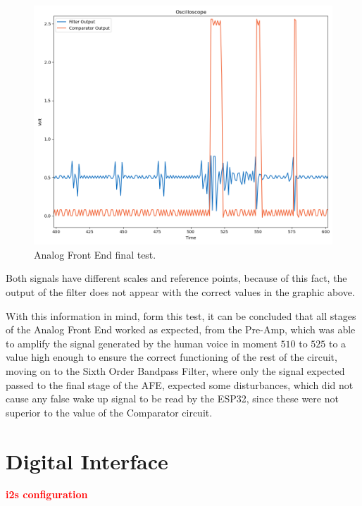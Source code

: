 \begin{figure}[H]
    \centering
    \includegraphics*[scale = 0.5]{Images/AFEtest.png}
    \caption{Analog Front End final test.}
    \label{fig:AFETest}
\end{figure}

Both signals have different scales and reference points, because of this fact, the output of the filter does not appear with the correct values in the graphic above. 

With this information in mind, form this test, it can be concluded that all stages of the Analog Front End worked as expected, from the Pre-Amp, which was able to amplify the signal generated by the human voice in moment $510$ to $525$ to a value high enough to ensure the correct functioning of the rest of the circuit, moving on to the Sixth Order Bandpass Filter, where only the signal expected passed to the final stage of the AFE, expected some disturbances, which did not cause any false wake up signal to be read by the ESP32, since these were not superior to the value of the Comparator circuit. 

\section{Digital Interface}

\textcolor{red}{\textbf{i2s configuration}}
